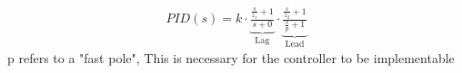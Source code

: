         \begin{align*}
            PID(s) = k \cdot \underbrace{\frac{\frac{s}{z_1} + 1}{s + 0}}_{\text{Lag}} \cdot \underbrace{\frac{\frac{s}{z_2} + 1}{\frac{s}{p} + 1}}_{\text{Lead}}
        \end{align*}
        p refers to a "fast pole", This is necessary for the controller to be implementable